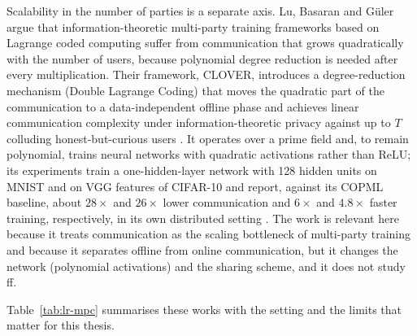 Scalability in the number of parties is a separate axis. Lu, Basaran and G\"uler argue that information-theoretic multi-party training frameworks based on Lagrange coded computing suffer from communication that grows quadratically with the number of users, because polynomial degree reduction is needed after every multiplication. Their framework, CLOVER, introduces a degree-reduction mechanism (Double Lagrange Coding) that moves the quadratic part of the communication to a data-independent offline phase and achieves linear communication complexity under information-theoretic privacy against up to $T$ colluding honest-but-curious users \cite{lu2024clover}. It operates over a prime field and, to remain polynomial, trains neural networks with quadratic activations rather than ReLU; its experiments train a one-hidden-layer network with 128 hidden units on MNIST and on VGG features of CIFAR-10 and report, against its COPML baseline, about $28\times$ and $26\times$ lower communication and $6\times$ and $4.8\times$ faster training, respectively, in its own distributed setting \cite{lu2024clover}. The work is relevant here because it treats communication as the scaling bottleneck of multi-party training and because it separates offline from online communication, but it changes the network (polynomial activations) and the sharing scheme, and it does not study \ac{ff}.

Table~\ref{tab:lr-mpc} summarises these works with the setting and the limits that matter for this thesis.

